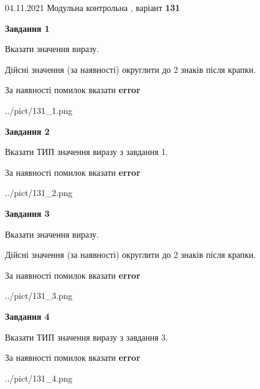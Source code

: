 \documentclass[11pt, ukrainian]{article}
\begin{document}
{04.11.2021 Модульна контрольна , варіант  \No \textbf { 131 }\par}
{
\begin {large}
{\begin {center}\textbf{Завдання 1}\end {center}}\par
Вказати значення виразу. \par
Дійсні значення (за наявності) округлити до 2 знаків після крапки. \par
За наявності помилок вказати \textbf{error}

\begin{center}
	{../pict/131_1.png}
\end{center}
\newpage

{\begin {center}\textbf{Завдання 2}\end {center}}\par
Вказати ТИП значення виразу з завдання 1. \par
За наявності помилок вказати \textbf{error}

\begin{center}
	{../pict/131_2.png}
\end{center}
\newpage

{\begin {center}\textbf{Завдання 3}\end {center}}\par
Вказати значення виразу. \par
Дійсні значення (за наявності) округлити до 2 знаків після крапки. \par
За наявності помилок вказати \textbf{error}

\begin{center}
	{../pict/131_3.png}
\end{center}
\newpage

{\begin {center}\textbf{Завдання 4}\end {center}}\par
Вказати ТИП значення виразу з завдання 3. \par
За наявності помилок вказати \textbf{error}

\begin{center}
	{../pict/131_4.png}
\end{center}
\newpage


\end{large}}
\end{document}
